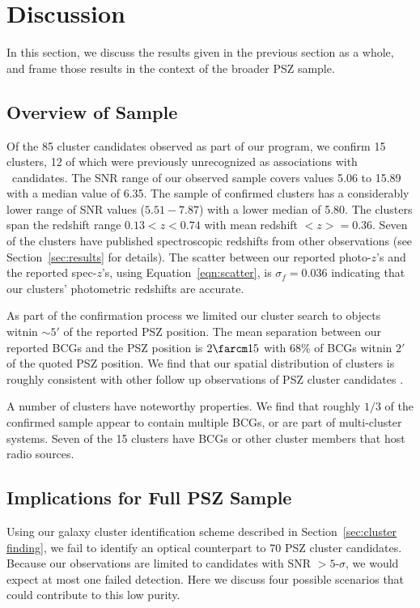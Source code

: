 \documentclass[apj, revtex4-1]{emulateapj}
\begin{document}

\section{Discussion}\label{sec:discussion}
In this section, we discuss the results given in the previous section as a whole, and frame those results in the context of the broader PSZ sample.

\subsection{Overview of Sample}
Of the 85 cluster candidates observed as part of our program, we confirm 15 clusters, 12 of which were previously unrecognized as associations with \planck\ candidates. The SNR range of our observed sample covers values 5.06 to 15.89 with a median value of 6.35. The sample of confirmed clusters has a considerably lower range of SNR values ($5.51 - 7.87$) with a lower median of 5.80. The clusters span the redshift range $ 0.13 < z < 0.74$ with mean redshift $<z> = 0.36$. Seven of the clusters have published spectroscopic redshifts from other observations (see Section~\ref{sec:results} for details). The scatter between our reported photo-$z$'s and the reported spec-$z$'s, using Equation~\ref{eqn:scatter}, is $\sigma_f = 0.036$ indicating that our clusters' photometric redshifts are accurate.

As part of the confirmation process we limited our cluster search to objects witnin $\sim$$5'$ of the reported PSZ position. The mean separation between our reported BCGs and the PSZ position is $2\farcm15$ with 68\% of BCGs witnin $2'$ of the quoted PSZ position. We find that our spatial distribution of clusters is roughly consistent with other follow up observations of PSZ cluster candidates .

A number of clusters have noteworthy properties. We find that roughly $1/3$ of the confirmed sample appear to contain multiple BCGs, or are part of multi-cluster systems. Seven of the 15 clusters have BCGs or other cluster members that host radio sources.

\subsection{Implications for Full PSZ Sample}
Using our galaxy cluster identification scheme described in Section~\ref{sec:cluster finding}, we fail to identify an optical counterpart to 70 PSZ cluster candidates. Because our observations are limited to candidates with SNR $>5$-$\sigma$, we would expect at most one failed detection. Here we discuss four possible scenarios that could contribute to this low purity.
\end{document}
